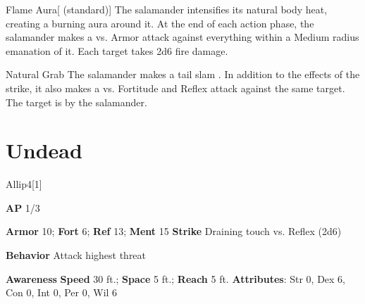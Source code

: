 \begin{apability}{Flame Aura}[ (standard)]
The salamander intensifies its natural body heat, creating a burning aura around it.
At the end of each action phase, the salamander makes a  vs. Armor
attack against everything within a Medium radius emanation of it.
\hit Each target takes 2d6 fire damage.
\end{apability}

\vspace{0.5em}
\begin{freeability}{Natural Grab}
The salamander makes a tail slam .
In addition to the effects of the strike, it also makes a  vs. Fortitude and Reflex attack against the same target.
\hit The target is  by the salamander.
\end{freeability}

\section{Undead}
\begin{monsection}{Allip}{4}[1]
\vspace{-1em}\vspace{-1em}
\begin{spellcontent}
\begin{spelltargetinginfo}
{\textbf{AP} 1/3}

\pari \textbf{Armor} 10;
\textbf{Fort} 6;
\textbf{Ref} 13;
\textbf{Ment} 15
\pari \textbf{Strike} Draining touch  vs. Reflex (2d6)



\pari \textbf{Behavior} Attack highest threat
\end{spelltargetinginfo}
\end{spellcontent}

\begin{monsterfooter}
\pari \textbf{Awareness} 
\pari \textbf{Speed} 30 ft.;
\textbf{Space} 5 ft.;
\textbf{Reach} 5 ft.
\pari \textbf{Attributes}:
Str 0,
Dex 6,
Con 0,
Int 0,
Per 0,
Wil 6
\end{monsterfooter}
\end{monsection}

